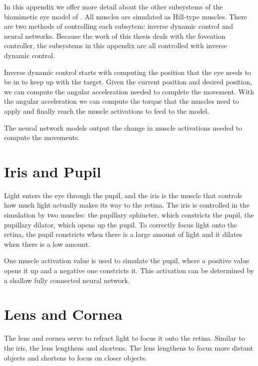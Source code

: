\documentclass [MS] {UCLAthesis}
\begin{document}
In this appendix we offer more detail about the other subsystems of the biomimetic eye model of \citet{Arjun}. All muscles are simulated as Hill-type muscles. There are two methods of controlling each subsytem: inverse dynamic control and neural networks. Because the work of this thesis deals with the foveation controller, the subsystems in this appendix are all controlled with inverse dynamic control.

Inverse dynamic control starts with computing the position that the eye needs to be in to keep up with the target. Given the current position and desired position, we can compute the angular acceleration needed to complete the movement. With the angular acceleration we can compute the torque that the muscles need to apply and finally reach the muscle activations to feed to the model.

The neural network models output the change in muscle activations needed to compute the movements.



\section{Iris and Pupil}

Light enters the eye through the pupil, and the iris is the muscle that controls how much light actually makes its way to the retina. The iris is controlled in the simulation by two muscles: the pupillary sphincter, which constricts the pupil, the pupillary dilator, which opens up the pupil. To correctly focus light onto the retina, the pupil constricts when there is a large amount of light and it dilates when there is a low amount. 

One muscle activation value is used to simulate the pupil, where a positive value opens it up and a negative one constricts it. This activation can be determined by a shallow fully connected neural network. 


\section{Lens and Cornea}

The lens and cornea serve to refract light to focus it onto the retina. Similar to the iris, the lens lengthens and shortens. The lens lengthens to focus more distant objects and shortens to focus on closer objects. 
\end{document}
